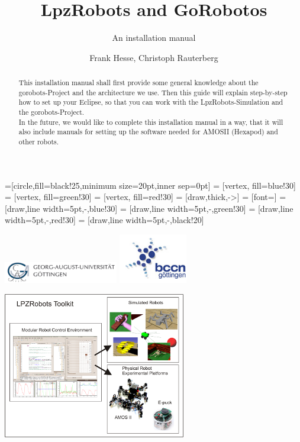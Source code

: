 \documentclass[a4paper,10pt]{scrartcl}
\title{LpzRobots and GoRobotos}
\subtitle{An installation manual}
\author{Frank Hesse, Christoph Rauterberg}
\begin{document}
 =[circle,fill=black!25,minimum size=20pt,inner sep=0pt]
  = [vertex, fill=blue!30]
  = [vertex, fill=green!30]
  = [vertex, fill=red!30]
  = [draw,thick,->]
  = [font=\small]
  = [draw,line width=5pt,-,blue!30]
  = [draw,line width=5pt,-,green!30]
  = [draw,line width=5pt,-,red!30]
  = [draw,line width=5pt,-,black!20]
\renewcommand{\emph}[1]{\textcolor{blue}{#1}}
\newcommand{\remph}[1]{\textcolor{red}{#1}}


\maketitle

\begin{center}
\includegraphics[width=5cm]{./Pics/LogoUni.png} %
 \includegraphics[width=3cm]{./Pics/LogoBCCN.png}\\ %
\end{center}

\begin{abstract}
This installation manual shall first provide some general knowledge about the gorobots-Project and 
the architecture we use. Then this guide will explain step-by-step how to set up 
your Eclipse, so that you can work with the LpzRobots-Simulation and the gorobots-Project. \\
In the future, we would like to complete this installation manual in a way, that it will also include manuals for setting up the software needed for AMOSII (Hexapod) and other robots.
\end{abstract}

\begin{center}
\includegraphics[width=8cm]{./Pics/AIdiagram.png}
\end{center}
\end{document}

